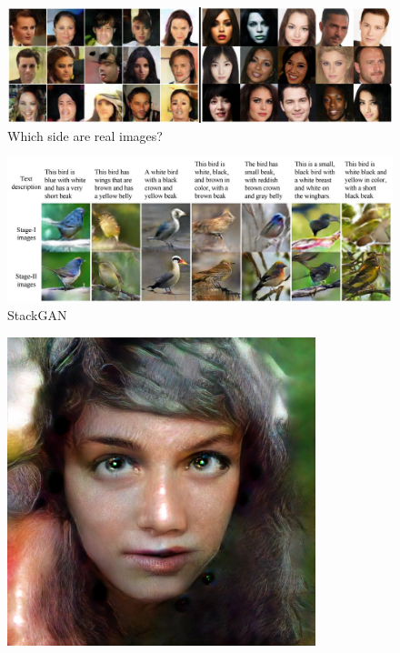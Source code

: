 \documentclass{Bredelebeamer}
\begin{document}
\begin{frame}
\begin{figure}[h!]
	\centering
	\includegraphics[width=\textwidth]{which_is_real.png}
	\caption{Which side are real images?}
	\label{fig:which_is_real}
\end{figure}
\end{frame}


\begin{frame}
\begin{figure}[h!]
	\centering
	\includegraphics[width=\textwidth]{stack_gan.jpg}
	\caption{StackGAN}
\end{figure}
\end{frame}

\begin{frame}
\begin{figure}[h!]
	\centering
	\includegraphics[width=0.8\textwidth]{4k_woman.jpg}
\end{figure}
\end{frame}
\end{document}
